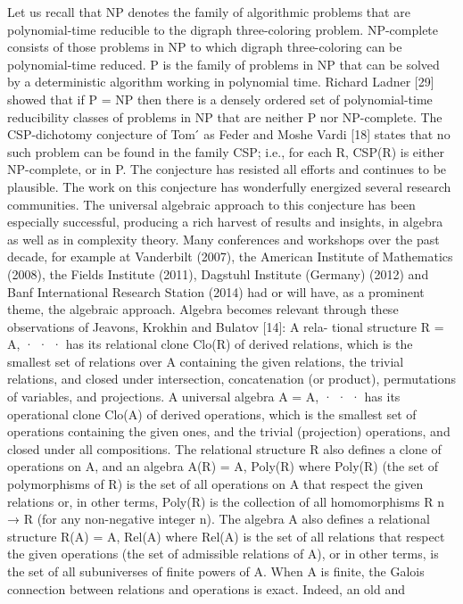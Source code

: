 \begin{thebibliography}{1}
Let us recall that NP denotes the family of algorithmic problems that are polynomial-time reducible
to the digraph three-coloring problem. NP-complete consists of those problems in NP to which digraph
three-coloring can be polynomial-time reduced. P is the family of problems in NP that can be solved by
a deterministic algorithm working in polynomial time. Richard Ladner [29] showed that if P = NP then
there is a densely ordered set of polynomial-time reducibility classes of problems in NP that are neither
P nor NP-complete. The \ac{CSP}-dichotomy conjecture of Tom ́
as Feder and Moshe Vardi [18] states that no
such problem can be found in the family CSP; i.e., for each R, CSP(R) is either NP-complete, or in P.
The conjecture has resisted all efforts and continues to be plausible. The work on this conjecture has
wonderfully energized several research communities. The universal algebraic approach to this conjecture
has been especially successful, producing a rich harvest of results and insights, in algebra as well as in
complexity theory. Many conferences and workshops over the past decade, for example at Vanderbilt
(2007), the American Institute of Mathematics (2008), the Fields Institute (2011), Dagstuhl Institute
(Germany) (2012) and Banf International Research Station (2014) had or will have, as a prominent theme,
the algebraic approach.
Algebra becomes relevant through these observations of Jeavons, Krokhin and Bulatov [14]: A rela-
tional structure R = A, · · · has its relational clone Clo(R) of derived relations, which is the smallest
set of relations over A containing the given relations, the trivial relations, and closed under intersection,
concatenation (or product), permutations of variables, and projections. A universal algebra A = A, · · ·
has its operational clone Clo(A) of derived operations, which is the smallest set of operations containing
the given ones, and the trivial (projection) operations, and closed under all compositions.
The relational structure R also defines a clone of operations on A, and an algebra
A(R) = A, Poly(R)
where Poly(R) (the set of polymorphisms of R) is the set of all operations on A that respect the given
relations or, in other terms, Poly(R) is the collection of all homomorphisms R n → R (for any non-negative
integer n). The algebra A also defines a relational structure
R(A) = A, Rel(A)
where Rel(A) is the set of all relations that respect the given operations (the set of admissible relations of
A), or in other terms, is the set of all subuniverses of finite powers of A.
When A is finite, the Galois connection between relations and operations is exact. Indeed, an old and

\end{thebibliography}
